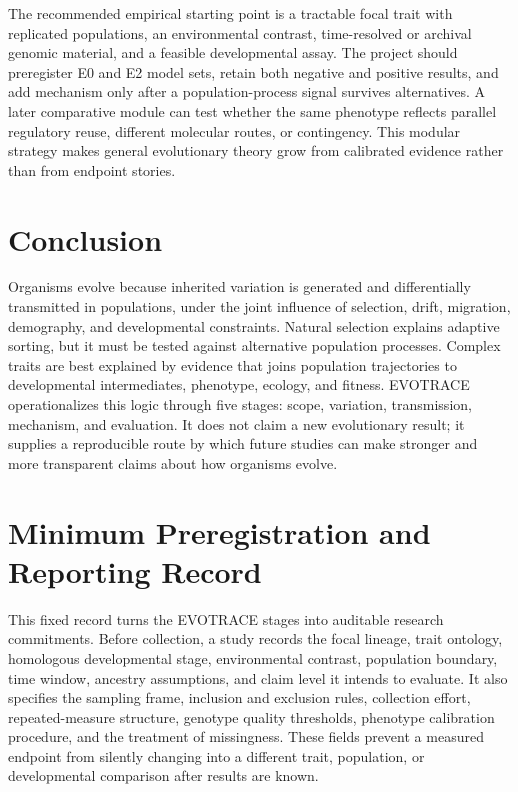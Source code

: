 \documentclass[conference]{IEEEtran}
\begin{document}
The recommended empirical starting point is a tractable focal trait with replicated populations, an environmental contrast, time-resolved or archival genomic material, and a feasible developmental assay. The project should preregister E0 and E2 model sets, retain both negative and positive results, and add mechanism only after a population-process signal survives alternatives. A later comparative module can test whether the same phenotype reflects parallel regulatory reuse, different molecular routes, or contingency. This modular strategy makes general evolutionary theory grow from calibrated evidence rather than from endpoint stories.

\section{Conclusion}

Organisms evolve because inherited variation is generated and differentially transmitted in populations, under the joint influence of selection, drift, migration, demography, and developmental constraints. Natural selection explains adaptive sorting, but it must be tested against alternative population processes. Complex traits are best explained by evidence that joins population trajectories to developmental intermediates, phenotype, ecology, and fitness. EVOTRACE operationalizes this logic through five stages: scope, variation, transmission, mechanism, and evaluation. It does not claim a new evolutionary result; it supplies a reproducible route by which future studies can make stronger and more transparent claims about how organisms evolve.

\appendices
\section{Minimum Preregistration and Reporting Record}

This fixed record turns the EVOTRACE stages into auditable research commitments. Before collection, a study records the focal lineage, trait ontology, homologous developmental stage, environmental contrast, population boundary, time window, ancestry assumptions, and claim level it intends to evaluate. It also specifies the sampling frame, inclusion and exclusion rules, collection effort, repeated-measure structure, genotype quality thresholds, phenotype calibration procedure, and the treatment of missingness. These fields prevent a measured endpoint from silently changing into a different trait, population, or developmental comparison after results are known.
\end{document}
